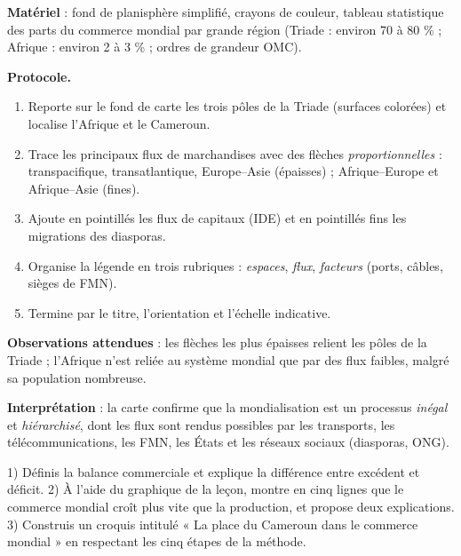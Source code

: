 \documentclass[11pt]{article}
\begin{document}
\begin{experience}
\textbf{Matériel} : fond de planisphère simplifié, crayons de couleur, tableau statistique des parts du commerce mondial par grande région (Triade : environ 70 à 80 \% ; Afrique : environ 2 à 3 \% ; ordres de grandeur OMC).

\textbf{Protocole.}
\begin{enumerate}
\item Reporte sur le fond de carte les trois pôles de la Triade (surfaces colorées) et localise l'Afrique et le Cameroun.
\item Trace les principaux flux de marchandises avec des flèches \emph{proportionnelles} : transpacifique, transatlantique, Europe--Asie (épaisses) ; Afrique--Europe et Afrique--Asie (fines).
\item Ajoute en pointillés les flux de capitaux (IDE) et en pointillés fins les migrations des diasporas.
\item Organise la légende en trois rubriques : \emph{espaces}, \emph{flux}, \emph{facteurs} (ports, câbles, sièges de FMN).
\item Termine par le titre, l'orientation et l'échelle indicative.
\end{enumerate}

\textbf{Observations attendues} : les flèches les plus épaisses relient les pôles de la Triade ; l'Afrique n'est reliée au système mondial que par des flux faibles, malgré sa population nombreuse.

\textbf{Interprétation} : la carte confirme que la mondialisation est un processus \emph{inégal} et \emph{hiérarchisé}, dont les flux sont rendus possibles par les transports, les télécommunications, les FMN, les États et les réseaux sociaux (diasporas, ONG).
\end{experience}

\begin{exercice}
1) Définis la balance commerciale et explique la différence entre excédent et déficit. 2) À l'aide du graphique de la leçon, montre en cinq lignes que le commerce mondial croît plus vite que la production, et propose deux explications. 3) Construis un croquis intitulé « La place du Cameroun dans le commerce mondial » en respectant les cinq étapes de la méthode.
\end{exercice}
\end{document}
